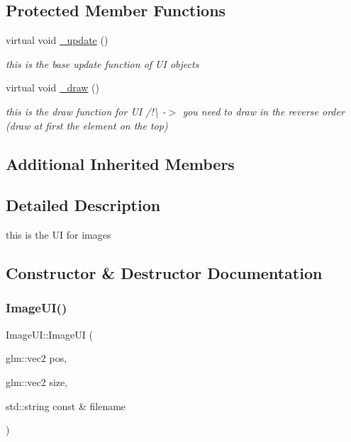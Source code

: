 \subsection*{Protected Member Functions}
\begin{DoxyCompactItemize}
\item 
\mbox{\label{class_image_u_i_aa03456c08f15deecb87b40b55e5b3126}} 
virtual void \hyperlink{class_image_u_i_aa03456c08f15deecb87b40b55e5b3126}{\+\_\+update} ()
\begin{DoxyCompactList}\small\item\em this is the base update function of UI objects \end{DoxyCompactList}\item 
\mbox{\label{class_image_u_i_a1c5403c96def58c34362022cb178003a}} 
virtual void \hyperlink{class_image_u_i_a1c5403c96def58c34362022cb178003a}{\+\_\+draw} ()
\begin{DoxyCompactList}\small\item\em this is the draw function for UI /!\textbackslash{} -\/$>$ you need to draw in the reverse order (draw at first the element on the top) \end{DoxyCompactList}\end{DoxyCompactItemize}
\subsection*{Additional Inherited Members}


\subsection{Detailed Description}
this is the UI for images 

\subsection{Constructor \& Destructor Documentation}
\mbox{\label{class_image_u_i_a6bab778baf2de7b6fa49fbae8cdbcfdd}} 
\subsubsection{\texorpdfstring{Image\+U\+I()}{ImageUI()}\hspace{0.1cm}{\footnotesize\ttfamily [1/2]}}
{\footnotesize\ttfamily Image\+U\+I\+::\+Image\+UI (\begin{DoxyParamCaption}\item[{glm\+::vec2}]{pos,  }\item[{glm\+::vec2}]{size,  }\item[{std\+::string const \&}]{filename }\end{DoxyParamCaption})}



